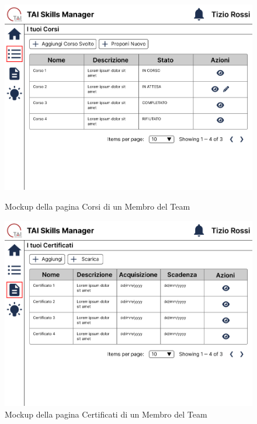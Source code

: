 \begin{figure}[ht!]  
    \centering
    \begin{minipage}{0.49\textwidth}
        \centering
        \includegraphics[width=\linewidth]{immagini/mockup/Pagina Corsi Membro del Team.png}
        \caption{Mockup della pagina Corsi di un Membro del Team}
        \label{mockup-corsi}
    \end{minipage}\hfill
    \begin{minipage}{0.49\textwidth}
        \centering
        \includegraphics[width=\linewidth]{immagini/mockup/Pagina Certificati Membro del Team.png}
        \caption{Mockup della pagina Certificati di un Membro del Team}
        \label{mockup-certificati}
    \end{minipage}
\end{figure}
